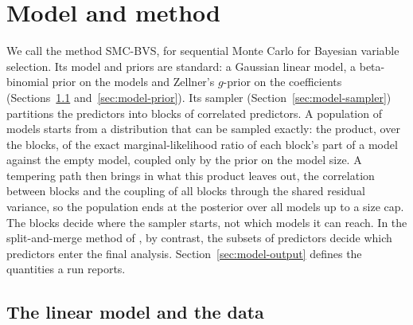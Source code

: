 
\section{Model and method}\label{sec:model}

We call the method SMC-BVS, for sequential Monte Carlo for Bayesian variable selection. Its model and priors are
standard: a Gaussian linear model, a beta-binomial prior on the models and Zellner's $g$-prior on the coefficients
(Sections~\ref{sec:model-data} and~\ref{sec:model-prior}). Its sampler (Section~\ref{sec:model-sampler}) partitions
the predictors into blocks of correlated predictors. A population of models starts from a distribution that can be
sampled exactly: the product, over the blocks, of the exact marginal-likelihood ratio of each block's part of a model
against the empty model, coupled only by the prior on the model size. A tempering path then brings in what this
product leaves out, the correlation between blocks and the coupling of all blocks through the shared residual
variance, so the population ends at the posterior over all models up to a size cap. The blocks
decide where the sampler starts, not which models it can reach. In the split-and-merge method of
\citet{SongLiang2015}, by contrast, the subsets of predictors decide which predictors enter the final analysis.
Section~\ref{sec:model-output} defines the quantities a run reports.

\subsection{The linear model and the data}\label{sec:model-data}

